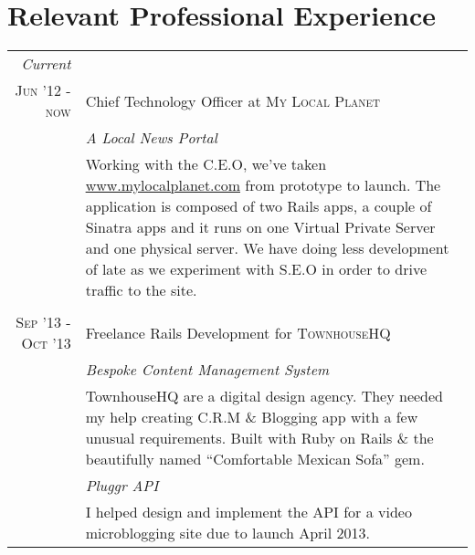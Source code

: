 \documentclass[a4paper,11pt]{article}
\begin{document}
\section{Relevant Professional Experience}
\begin{tabular}{r|p{11.2cm}}
  \emph{Current} \\
  \textsc{Jun '12 - now} & Chief Technology Officer at \textsc{My Local Planet}\\
                         &\emph{A Local News Portal}\\
                         &\footnotesize{Working with the C.E.O, we've taken \href{www.mylocalplanet.com}{www.mylocalplanet.com}
  from prototype to launch. The application is composed of two Rails apps, a couple of Sinatra apps
  and it runs on one Virtual Private Server and one physical server. We have doing less development
  of late as we experiment with S.E.O in order to drive traffic to the site.}
  \\\multicolumn{2}{c}{} \\
  \textsc{Sep '13 - Oct '13} & Freelance Rails Development for \textsc{TownhouseHQ} \\
                             &\emph{Bespoke Content Management System}\\
                             &\footnotesize{TownhouseHQ are a digital design agency. They needed my help
  creating C.R.M \& Blogging app with a few unusual requirements. Built with Ruby on Rails \& the
  beautifully named “Comfortable Mexican Sofa” gem.}\\
                             &\emph{Pluggr API}\\
                             &\footnotesize{ I helped design and implement the API for a video
  microblogging site due to launch April 2013. }
\end{tabular}
\end{document}
